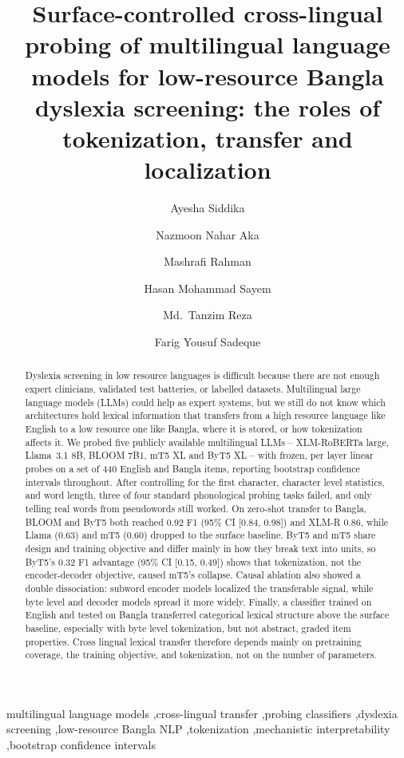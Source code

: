 \documentclass[preprint,12pt]{elsarticle}
\begin{document}
\begin{frontmatter}

\title{Surface-controlled cross-lingual probing of multilingual language models for low-resource Bangla dyslexia screening: the roles of tokenization, transfer and localization}

\author[bracu]{Ayesha Siddika}
\author[bracu]{Nazmoon Nahar Aka}
\author[bracu]{Mashrafi Rahman}
\author[bracu]{Hasan Mohammad Sayem}
\author[bracu]{Md.\ Tanzim Reza}
\author[bracu]{Farig Yousuf Sadeque}



\begin{abstract}
Dyslexia screening in low resource languages is difficult because there are not enough expert clinicians, validated test batteries, or labelled datasets. Multilingual large language models (LLMs) could help as expert systems, but we still do not know which architectures hold lexical information that transfers from a high resource language like English to a low resource one like Bangla, where it is stored, or how tokenization affects it. We probed five publicly available multilingual LLMs -- XLM-RoBERTa large, Llama~3.1 8B, BLOOM 7B1, mT5 XL and ByT5 XL -- with frozen, per layer linear probes on a set of 440 English and Bangla items, reporting bootstrap confidence intervals throughout. After controlling for the first character, character level statistics, and word length, three of four standard phonological probing tasks failed, and only telling real words from pseudowords still worked. On zero-shot transfer to Bangla, BLOOM and ByT5 both reached 0.92 F1 (95\% CI [0.84, 0.98]) and XLM-R 0.86, while Llama (0.63) and mT5 (0.60) dropped to the surface baseline. ByT5 and mT5 share design and training objective and differ mainly in how they break text into units, so ByT5's 0.32 F1 advantage (95\% CI [0.15, 0.49]) shows that tokenization, not the encoder-decoder objective, caused mT5's collapse. Causal ablation also showed a double dissociation: subword encoder models localized the transferable signal, while byte level and decoder models spread it more widely. Finally, a classifier trained on English and tested on Bangla transferred categorical lexical structure above the surface baseline, especially with byte level tokenization, but not abstract, graded item properties. Cross lingual lexical transfer therefore depends mainly on pretraining coverage, the training objective, and tokenization, not on the number of parameters.
\end{abstract}

\begin{keyword}
multilingual language models \sep cross-lingual transfer \sep probing classifiers \sep dyslexia screening \sep low-resource Bangla NLP \sep tokenization \sep mechanistic interpretability \sep bootstrap confidence intervals
\end{keyword}

\end{frontmatter}
\end{document}
